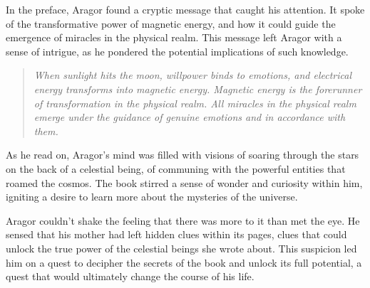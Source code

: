 In the preface, Aragor found a cryptic message that caught his attention. It spoke of the transformative power of magnetic energy, and how it could guide the emergence of miracles in the physical realm. This message left Aragor with a sense of intrigue, as he pondered the potential implications of such knowledge.


\begin{quote}
  \itshape %
  \small %
When sunlight hits the moon, willpower binds to emotions, and electrical energy transforms into magnetic energy. Magnetic energy is the forerunner of transformation in the physical realm. All miracles in the physical realm emerge under the guidance of genuine emotions and in accordance with them.
 \end{quote}

 As he read on, Aragor's mind was filled with visions of soaring through the stars on the back of a celestial being, of communing with the powerful entities that roamed the cosmos. The book stirred a sense of wonder and curiosity within him, igniting a desire to learn more about the mysteries of the universe.

Aragor couldn't shake the feeling that there was more to it than met the eye. He sensed that his mother had left hidden clues within its pages, clues that could unlock the true power of the celestial beings she wrote about. This suspicion led him on a quest to decipher the secrets of the book and unlock its full potential, a quest that would ultimately change the course of his life.

